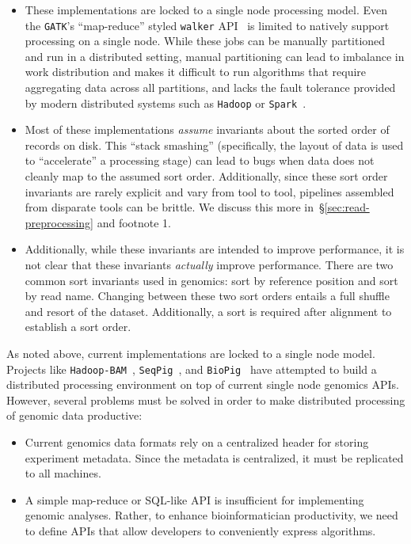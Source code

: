 \documentclass[masters]{ucbthesis}
\begin{document}
\begin{itemize}
\item These implementations are locked to a single node processing model. Even the \texttt{GATK}'s
``map-reduce'' styled \texttt{walker} API~\cite{mckenna10} is limited to natively support processing on
a single node. While these jobs can be manually partitioned and run in a distributed setting, manual
partitioning can lead to imbalance in work distribution and makes it difficult to run algorithms that
require aggregating data across all partitions, and lacks the fault tolerance provided by modern
distributed systems such as \texttt{Hadoop} or \texttt{Spark}~\cite{zaharia12}.
\item Most of these implementations \emph{assume} invariants about the sorted order of records on
disk. This ``stack smashing'' (specifically, the layout of data is used to ``accelerate'' a processing stage)
can lead to bugs when data does not cleanly map to the assumed sort order. Additionally, since these
sort order invariants are rarely explicit and vary from tool to tool, pipelines assembled from disparate
tools can be brittle. We discuss this more in~\S\ref{sec:read-preprocessing} and footnote 1.
\item Additionally, while these invariants are intended to improve performance, it is not clear that these
invariants \emph{actually} improve performance. There are two common sort invariants used in genomics:
sort by reference position and sort by read name. Changing between these two sort orders entails
a full shuffle and resort of the dataset. Additionally, a sort is required after alignment to establish a sort order.
\end{itemize}

As noted above, current implementations are locked to a single node model. Projects like
\texttt{Hadoop-BAM}~\cite{niemenmaa12}, \texttt{SeqPig}~\cite{schumacher14}, and \texttt{BioPig}~\cite{nordberg13}
have attempted to build a distributed processing environment on top of current single node genomics APIs.
However, several problems must be solved in order to make distributed processing of genomic data productive:

\begin{itemize}
\item Current genomics data formats rely on a centralized header for storing experiment metadata. Since the
metadata is centralized, it must be replicated to all machines.
\item A simple map-reduce or SQL-like API is insufficient for implementing genomic analyses. Rather, to enhance
bioinformatician productivity, we need to define APIs that allow developers to conveniently express algorithms.
\end{itemize}
\end{document}
